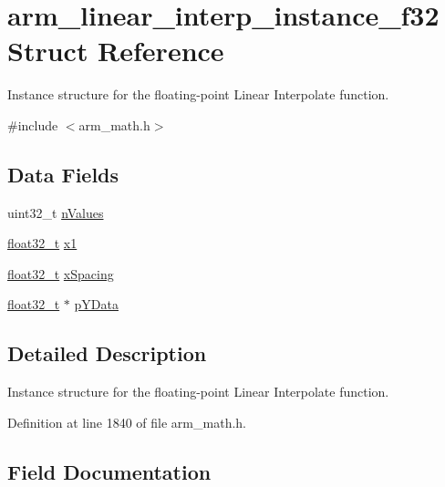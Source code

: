 \hypertarget{structarm__linear__interp__instance__f32}{}\section{arm\+\_\+linear\+\_\+interp\+\_\+instance\+\_\+f32 Struct Reference}
\label{structarm__linear__interp__instance__f32}


Instance structure for the floating-\/point Linear Interpolate function.  




{\ttfamily \#include $<$arm\+\_\+math.\+h$>$}

\subsection*{Data Fields}
\begin{DoxyCompactItemize}
\item 
uint32\+\_\+t \hyperlink{structarm__linear__interp__instance__f32_a2ea653b0599388e9a72ebab9841707ba}{n\+Values}
\item 
\hyperlink{arm__math_8h_a4611b605e45ab401f02cab15c5e38715}{float32\+\_\+t} \hyperlink{structarm__linear__interp__instance__f32_a795ed79ea4c18d52afe5eb5e868e1c5a}{x1}
\item 
\hyperlink{arm__math_8h_a4611b605e45ab401f02cab15c5e38715}{float32\+\_\+t} \hyperlink{structarm__linear__interp__instance__f32_a08675584bb57fc42bbb3739c13674346}{x\+Spacing}
\item 
\hyperlink{arm__math_8h_a4611b605e45ab401f02cab15c5e38715}{float32\+\_\+t} $\ast$ \hyperlink{structarm__linear__interp__instance__f32_af1489866b69eb5db1e0afeb24c7b01e9}{p\+Y\+Data}
\end{DoxyCompactItemize}


\subsection{Detailed Description}
Instance structure for the floating-\/point Linear Interpolate function. 

Definition at line 1840 of file arm\+\_\+math.\+h.



\subsection{Field Documentation}
